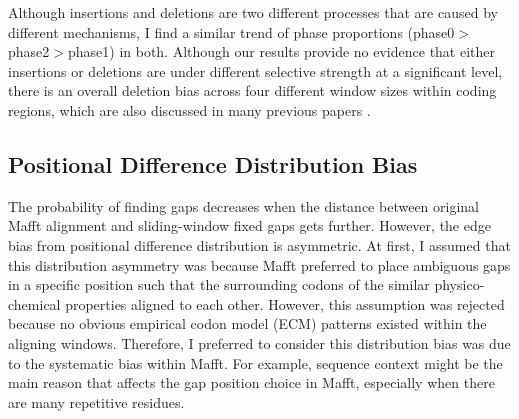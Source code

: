 Although insertions and deletions are two different processes that are caused by different mechanisms, I find a similar trend of phase proportions (phase0$>$phase2$>$phase1) in both.  Although our results provide no evidence that either insertions or deletions are under different selective strength at a significant level, there is an overall deletion bias across four different window sizes within coding regions, which are also discussed in many previous papers \parencite{loewenthal2021probabilistic, gregory2004insertion, montoya2003recombination}. 

\subsection{Positional Difference Distribution Bias} 
The probability of finding gaps decreases when the distance between original Mafft alignment and sliding-window fixed gaps gets further. However, the edge bias from positional difference distribution is asymmetric. At first, I assumed that this distribution asymmetry was because Mafft preferred to place ambiguous gaps in a specific position such that the surrounding codons of the similar physico-chemical properties aligned to each other. However, this assumption was rejected because no obvious empirical codon model (ECM) patterns existed within the aligning windows. Therefore, I preferred to consider this distribution bias was due to the systematic bias within Mafft. For example, sequence context might be the main reason that affects the gap position choice in Mafft, especially when there are many repetitive residues.  



 




